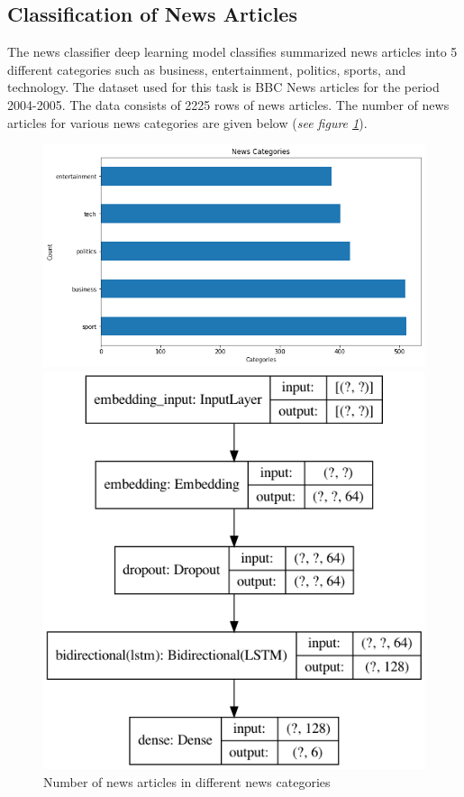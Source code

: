 \documentclass[a4paper,4pt]{article}
\begin{document}
\subsection{Classification of News Articles}
The news classifier deep learning model classifies summarized news articles into 5 different categories such as business, 
entertainment, politics, sports, and technology. The dataset used for this task is BBC News articles for the period 2004-2005.
The data consists of 2225 rows of news articles. The number of news articles for various news categories are given below
(\textit{see figure \ref{fig:newscategories}}).
\begin{center}
    \begin{figure}[h]
        \begin{minipage}{.5\textwidth}
            \centering
            \includegraphics[scale=0.45]{images/categories_plot.png}
            \caption{Number of news articles in different news categories}
            \label{fig:newscategories}
        \end{minipage}
        \begin{minipage}{.6\textwidth}
            \centering
            \includegraphics[scale=0.35]{images/model_plot.png}

\end{minipage}
\end{figure}
\end{center}
\end{document}
